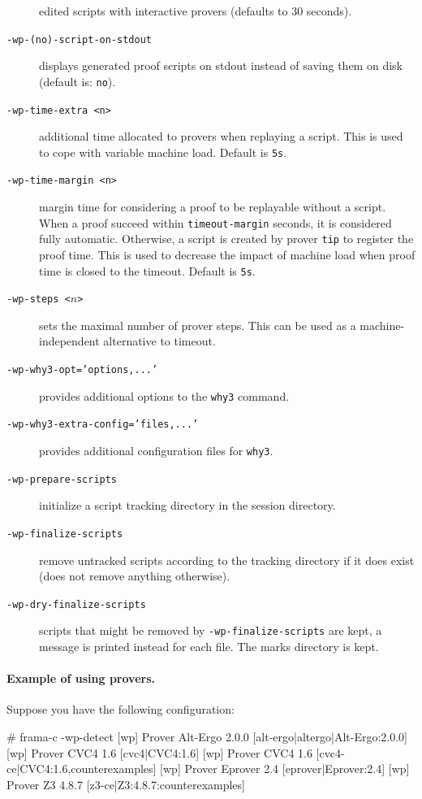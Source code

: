 \begin{description}
  edited scripts with interactive provers (defaults to 30 seconds).
\item[\tt -wp-(no)-script-on-stdout] displays generated proof scripts on stdout
  instead of saving them on disk (default is: \texttt{no}).
\item[\tt -wp-time-extra <n>] additional time allocated to provers when
  replaying a script. This is used to cope with variable machine load.
  Default is \verb+5s+.
\item[\tt -wp-time-margin <n>] margin time for considering a proof to be
  replayable without a script. When a proof succeed within \verb+timeout-margin+
  seconds, it is considered fully automatic. Otherwise, a script is created
  by prover \verb+tip+ to register the proof time. This is used to decrease the
  impact of machine load when proof time is closed to the timeout.
  Default is \verb+5s+.
\item[\tt -wp-steps <$n$>] sets the maximal number of prover
  steps. This can be used as a machine-independent alternative to timeout.
\item[\tt -wp-why3-opt='options,...'] provides additional options to the
  \verb+why3+ command.
\item[\tt -wp-why3-extra-config='files,...'] provides additional configuration
  files for \verb+why3+.
\item[\tt -wp-prepare-scripts] initialize a script tracking directory in the
  session directory.
\item[\tt -wp-finalize-scripts] remove untracked scripts according to the
  tracking directory if it does exist (does not remove anything otherwise).
\item[\tt -wp-dry-finalize-scripts] scripts that might be removed by
  \verb+-wp-finalize-scripts+ are kept, a message is printed instead for each
  file. The marks directory is kept.
\end{description}

\paragraph{Example of using provers.}
Suppose you have the following configuration:

\begin{logs}
# frama-c -wp-detect
[wp] Prover   Alt-Ergo 2.0.0  [alt-ergo|altergo|Alt-Ergo:2.0.0]
[wp] Prover       CVC4 1.6    [cvc4|CVC4:1.6]
[wp] Prover       CVC4 1.6    [cvc4-ce|CVC4:1.6,counterexamples]
[wp] Prover    Eprover 2.4    [eprover|Eprover:2.4]
[wp] Prover         Z3 4.8.7  [z3-ce|Z3:4.8.7:counterexamples]
\end{logs}


